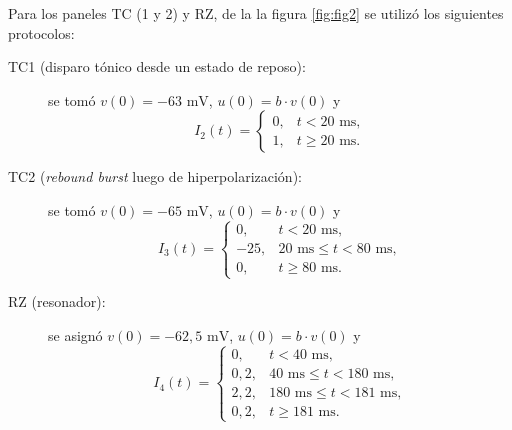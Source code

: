 \documentclass[aps,prl,twocolumn,superscriptaddress]{revtex4-2}
\begin{document}
Para los paneles TC (1 y 2) y RZ, de la la figura \ref{fig:fig2} se utilizó los siguientes protocolos:

\begin{description}
    \item[TC1 (disparo tónico desde un estado de reposo):] se tomó $v(0) = -63\text{ mV}$, $u(0) = b \cdot v(0)$ y
    \begin{equation}
        I_2(t) =
        \begin{cases} 
            0, & t < 20\text{ ms,} \\ 
            1, & t \geq 20\text{ ms.} 
        \end{cases}
    \end{equation}

    \item[TC2 (\textit{rebound burst} luego de hiperpolarización):] se tomó $v(0) = -65\text{ mV}$, $u(0) = b \cdot v(0)$ y
    \begin{equation}
        I_3(t) =
        \begin{cases} 
            0, & t < 20\text{ ms,} \\ 
            -25, & 20\text{ ms} \leq t < 80\text{ ms,} \\ 
            0, & t \geq 80\text{ ms.} 
        \end{cases}
    \end{equation}
    
    \item[RZ (resonador):] se asignó $v(0) = -62{,}5\text{ mV}$, $u(0) = b \cdot v(0)$ y
    \begin{equation}
        I_4(t) =
        \begin{cases} 
            0, & t < 40\text{ ms,} \\ 
            0{,}2, & 40\text{ ms} \leq t < 180\text{ ms,} \\ 
            2{,}2, & 180\text{ ms} \leq t < 181\text{ ms,} \\ 
            0{,}2, & t \geq 181\text{ ms.} 
        \end{cases}
    \end{equation}
\end{description}
\end{document}
